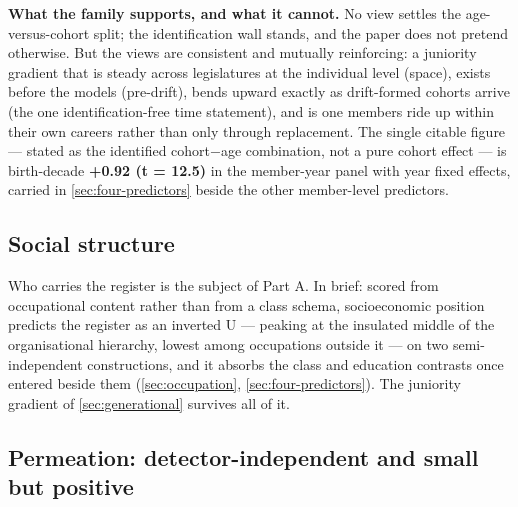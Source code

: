 \textbf{What the family supports, and what it cannot.} No view settles the age-versus-cohort split; the identification wall stands, and the paper does not pretend otherwise. But the views are consistent and mutually reinforcing: a juniority gradient that is steady across legislatures at the individual level (space), exists before the models (pre-drift), bends upward exactly as drift-formed cohorts arrive (the one identification-free time statement), and is one members ride up within their own careers rather than only through replacement. The single citable figure --- stated as the identified cohort\(-\)age combination, not a pure cohort effect --- is birth-decade \textbf{+0.92 (t = 12.5)} in the member-year panel with year fixed effects, carried in \cref{sec:four-predictors} beside the other member-level predictors.

\subsection{Social structure}\label{sec:social-structure}

Who carries the register is the subject of Part A. In brief: scored from
occupational content rather than from a class schema, socioeconomic position
predicts the register as an inverted U --- peaking at the insulated middle of the
organisational hierarchy, lowest among occupations outside it --- on two
semi-independent constructions, and it absorbs the class and education
contrasts once entered beside them (\cref{sec:occupation}, \cref{sec:four-predictors}). The juniority gradient of
\cref{sec:generational} survives all of it.

\subsection{Permeation: detector-independent and small but positive}\label{sec:permeation}

